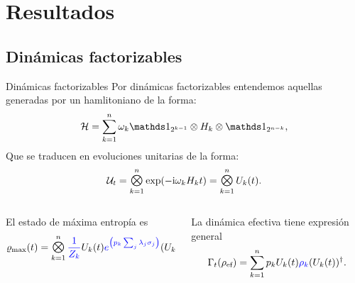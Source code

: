 \section{Resultados}
\subsection{Dinámicas factorizables}
\begin{frame}{Dinámicas factorizables}
    Por dinámicas factorizables entendemos aquellas generadas por un hamlitoniano de la forma:
    \begin{equation}
        \mcH=\sum_{k=1}^{n}\omega_{k}\Id_{2^{k-1}}\otimes H_{k} \otimes \Id_{2^{n-k}},\nonumber
    \end{equation}
    Que se traducen en evoluciones unitarias de la forma:
    \begin{equation}
        \mcU_{t}=\Motimes_{k=1}^{n}\text{exp}\qty(-\rmi\omega_{k}H_{k}t)=\Motimes_{k=1}^{n} U_{k}(t).\nonumber
    \end{equation}
    \begin{columns}
        \begin{column}{0.5\textwidth}
            El estado de máxima entropía es
            \begin{equation}
                \varrho_{\max}(t)=\Motimes_{k=1}^{n}{\color{blue}\frac{1}{Z_{k}}}U_{k}(t) {\color{blue}e^{\qty(p_{k}\sum_{j}\lambda_{j}\pauli{j})}} (U_{k}(t))^{\dag}\nonumber
            \end{equation}
        \end{column}
        \begin{column}{0.5\textwidth}
            La dinámica efectiva tiene expresión general
            \begin{equation}
                \Gamma_{t}(\rho_{\text{ef}})=\sum_{k=1}^{n}p_{k} U_{k}(t) {\color{blue}\rho_{k}} (U_{k}(t))^{\dag}.\nonumber
            \end{equation}
        \end{column}
    \end{columns}
\end{frame}

